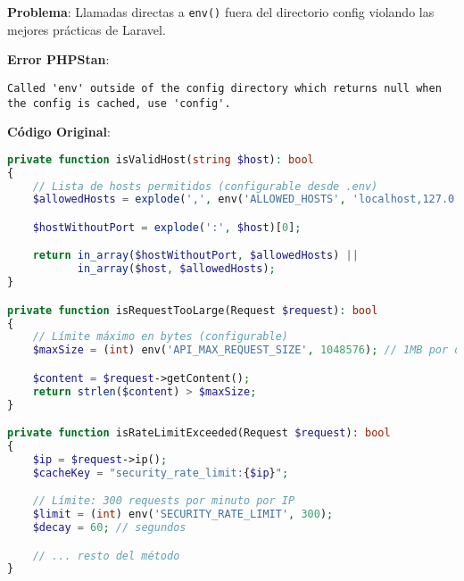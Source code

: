 \documentclass[12pt,a4paper]{article}
\begin{document}
\textbf{Problema}: Llamadas directas a \texttt{env()} fuera del directorio config violando las mejores prácticas de Laravel.

\textbf{Error PHPStan}:
\begin{lstlisting}[caption=Error reportado por PHPStan]
Called 'env' outside of the config directory which returns null when
the config is cached, use 'config'.
\end{lstlisting}

\textbf{Código Original}:
\begin{lstlisting}[language=php, caption=Antes - Llamadas directas a env()]
private function isValidHost(string $host): bool
{
    // Lista de hosts permitidos (configurable desde .env)
    $allowedHosts = explode(',', env('ALLOWED_HOSTS', 'localhost,127.0.0.1'));

    $hostWithoutPort = explode(':', $host)[0];

    return in_array($hostWithoutPort, $allowedHosts) ||
           in_array($host, $allowedHosts);
}

private function isRequestTooLarge(Request $request): bool
{
    // Límite máximo en bytes (configurable)
    $maxSize = (int) env('API_MAX_REQUEST_SIZE', 1048576); // 1MB por defecto

    $content = $request->getContent();
    return strlen($content) > $maxSize;
}

private function isRateLimitExceeded(Request $request): bool
{
    $ip = $request->ip();
    $cacheKey = "security_rate_limit:{$ip}";

    // Límite: 300 requests por minuto por IP
    $limit = (int) env('SECURITY_RATE_LIMIT', 300);
    $decay = 60; // segundos

    // ... resto del método
}
\end{lstlisting}
\end{document}
